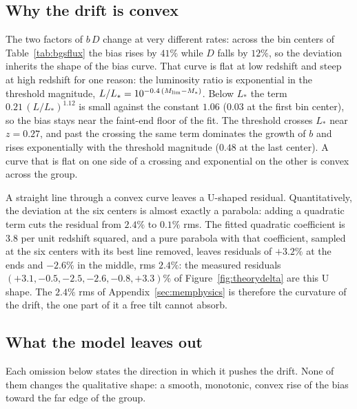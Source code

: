 \documentclass[11pt]{article}
\begin{document}
\subsection{Why the drift is convex}
\label{sec:bgsconvex}

The two factors of $b\,D$ change at very different rates: across the
bin centers of Table~\ref{tab:bgsflux} the bias rises by $41\%$
while $D$ falls by $12\%$, so the deviation inherits the shape of
the bias curve.  That curve is flat at low redshift and steep at
high redshift for one reason: the luminosity ratio is exponential in
the threshold magnitude, $L/L_* = 10^{-0.4\,(M_{\rm lim} - M_*)}$.
Below $L_*$ the term $0.21\,(L/L_*)^{1.12}$ is small against the
constant $1.06$ ($0.03$ at the first bin center), so the bias stays
near the faint-end floor of the fit.  The threshold crosses $L_*$
near $z = 0.27$, and past the crossing the same term dominates the
growth of $b$ and rises exponentially with the threshold magnitude
($0.48$ at the last center).  A curve that is flat on one side of a
crossing and exponential on the other is convex across the group.

A straight line through a convex curve leaves a U-shaped residual.
Quantitatively, the deviation at the six centers is almost exactly a
parabola: adding a quadratic term cuts the residual from $2.4\%$ to
$0.1\%$ rms.  The fitted quadratic coefficient is $3.8$ per unit
redshift squared, and a pure parabola with that coefficient, sampled
at the six centers with its best line removed, leaves residuals of
$+3.2\%$ at the ends and $-2.6\%$ in the middle, rms $2.4\%$:
the measured residuals $(+3.1, -0.5, -2.5, -2.6, -0.8, +3.3)\%$ of
Figure~\ref{fig:theorydelta} are this U shape.  The $2.4\%$ rms of
Appendix~\ref{sec:memphysics} is therefore the curvature of the
drift, the one part of it a free tilt cannot absorb.

\subsection{What the model leaves out}
\label{sec:bgsomissions}

Each omission below states the direction in which it pushes the
drift.  None of them changes the qualitative shape: a smooth,
monotonic, convex rise of the bias toward the far edge of the group.
\end{document}
